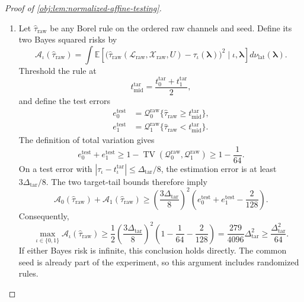 \begin{proof}[Proof of \cref{obj:lem:normalized-affine-testing}]
\begin{enumerate}
The required exponential comparison follows from
\[
2^{50}\le e^{\ell_{\mathrm{plain}}/4},
\qquad
\frac{\ell_{\mathrm{plain}}}{4}
\le e^{\ell_{\mathrm{plain}}/4}.
\]
The first uses \(e>2\) and
\(50\le\ell_{\mathrm{plain}}/4\); the second follows from
\(1+t\le e^t\). Multiplying gives
\[
e^{\ell_{\mathrm{plain}}/2}
\ge2^{48}\ell_{\mathrm{plain}}
\ge180\cdot2^{30}\ell_{\mathrm{plain}}.
\]
Since \(\sqrt S=e^{\ell_{\mathrm{plain}}/2}\),
\[
K_*\ge10\cdot2^{30}\ell_{\mathrm{plain}}L.
\]
Finally,
\[
1\le\ell_{\mathrm{plain}}L,\qquad
\epsilon^2L^2\le\frac{L^2}{16}
\le\frac{10}{16}\ell_{\mathrm{plain}}L,
\]
so
\[
1+\epsilon^2L^2\le10\ell_{\mathrm{plain}}L,
\qquad
K_*\ge2^{30}(1+\epsilon^2L^2).
\]
Substituting into the preceding tail bound proves, for both hypotheses,
\[
\nu_{\mathrm{lat}}\left\{
|\tau_\iota-t_\iota^{\mathrm{tar}}|
\ge\frac{\Delta_{\mathrm{tar}}}{8}\right\}
\le\frac1{128}.
\]

\item
Let \(\widehat\tau_{\mathrm{raw}}\) be any Borel rule on the ordered raw channels and seed. Define its two Bayes squared risks by
\[
\mathcal A_\iota(\widehat\tau_{\mathrm{raw}})
=
\int
\mathbb E\left[
\bigl(\widehat\tau_{\mathrm{raw}}
(\mathcal L_{\mathrm{raw}},\mathcal X_{\mathrm{raw}},U)
-\tau_\iota(\boldsymbol\lambda)\bigr)^2
\mid\iota,\boldsymbol\lambda
\right]d\nu_{\mathrm{lat}}(\boldsymbol\lambda).
\]
Threshold the rule at
\[
t_{\mathrm{mid}}^{\mathrm{tar}}
=\frac{t_0^{\mathrm{tar}}+t_1^{\mathrm{tar}}}{2},
\]
and define the test errors
\[
\begin{aligned}
e_0^{\mathrm{test}}
&=\mathcal Q_0^{\mathrm{raw}}
  \{\widehat\tau_{\mathrm{raw}}\ge t_{\mathrm{mid}}^{\mathrm{tar}}\},\\
e_1^{\mathrm{test}}
&=\mathcal Q_1^{\mathrm{raw}}
  \{\widehat\tau_{\mathrm{raw}}<t_{\mathrm{mid}}^{\mathrm{tar}}\}.
\end{aligned}
\]
The definition of total variation gives
\[
e_0^{\mathrm{test}}+e_1^{\mathrm{test}}
\ge1-\operatorname{TV}(\mathcal Q_0^{\mathrm{raw}},
                       \mathcal Q_1^{\mathrm{raw}})
\ge1-\frac1{64}.
\]
On a test error with
\(|\tau_\iota-t_\iota^{\mathrm{tar}}|\le\Delta_{\mathrm{tar}}/8\),
the estimation error is at least \(3\Delta_{\mathrm{tar}}/8\). The two target-tail bounds therefore imply
\[
\mathcal A_0(\widehat\tau_{\mathrm{raw}})
+\mathcal A_1(\widehat\tau_{\mathrm{raw}})
\ge
\left(\frac{3\Delta_{\mathrm{tar}}}{8}\right)^2
\left(e_0^{\mathrm{test}}+e_1^{\mathrm{test}}-\frac2{128}\right).
\]
Consequently,
\[
\max_{\iota\in\{0,1\}}\mathcal A_\iota(\widehat\tau_{\mathrm{raw}})
\ge
\frac12\left(\frac{3\Delta_{\mathrm{tar}}}{8}\right)^2
\left(1-\frac1{64}-\frac2{128}\right)
=\frac{279}{4096}\Delta_{\mathrm{tar}}^2
\ge\frac{\Delta_{\mathrm{tar}}^2}{64}.
\]
If either Bayes risk is infinite, this conclusion holds directly. The common seed is already part of the experiment, so this argument includes randomized rules.


\end{enumerate}
\end{proof}

